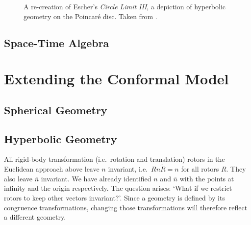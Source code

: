 \begin{figure} \centering
{}
\caption{A re-creation of Escher's \emph{Circle Limit III}, 
a depiction of hyperbolic geometry on the Poincar\'e disc.
Taken from \cite{transhyp}.}
\label{fig:circlelimit}
\end{figure}



\subsection{Space-Time Algebra}

\section{Extending the Conformal Model}
\subsection{Spherical Geometry}
\subsection{Hyperbolic Geometry}


All rigid-body transformation (i.e.\ rotation and translation) rotors in 
the Euclidean approach above leave $n$ invariant, i.e.\ 
$Rn\tilde{R} = n$ for all rotors $R$. They also leave $\bar{n}$ invariant. We have
already identified $n$ and $\bar{n}$ with the points at infinity and the origin 
respectively. The question arises: `What if we restrict rotors to keep other
vectors invariant?'. Since a geometry is defined by its congruence transformations,
changing those transformations will therefore reflect a different geometry.

